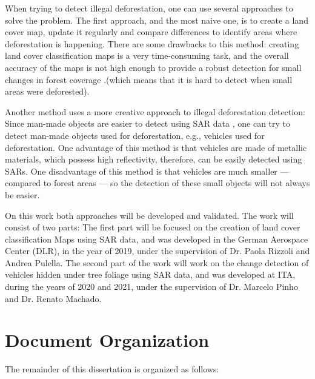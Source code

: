When trying to detect illegal deforestation, one can use several approaches to solve the problem. The first approach, and the most naive one, is to create a land cover map, update it regularly and compare differences to identify
areas where deforestation is happening. There are some drawbacks to this method: creating land cover classification maps is a very time-consuming task, and the overall accuracy of the maps is not high enough to provide a robust detection for small changes in forest coverage \cite{Rodrigo}.(which means that it is hard to detect when small areas were deforested).

Another method uses a more creative approach to illegal deforestation detection: Since man-made objects are easier to detect using SAR data \cite{manmade}, one can try to detect man-made objects used for deforestation, e.g., vehicles used for deforestation.
One advantage of this method is that vehicles are made of metallic materials, which possess high reflectivity, therefore, can be easily detected using SARs. One disadvantage of this method is that vehicles are much smaller — compared to forest areas — so the detection of these small objects will not always be easier.

On this work both approaches will be developed and validated. The work will consist of two parts: The first part will be focused on the creation of land cover classification Maps
using SAR data, and was developed in the German Aerospace Center (DLR), in the year of 2019, under the supervision of Dr. Paola Rizzoli and Andrea Pulella. The second part of the work will work on the
change detection of vehicles hidden under tree foliage using SAR data, and was developed at ITA, during the years of 2020 and 2021, under the supervision of Dr. Marcelo Pinho and Dr. Renato Machado.

\section{Document Organization}
The remainder of this dissertation is organized as follows:

